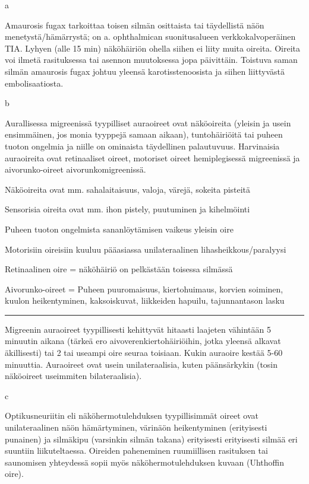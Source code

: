 \documentclass[
]{book}
\begin{document}
a

Amaurosis fugax tarkoittaa toisen silmän osittaista tai täydellistä näön menetystä/hämärrystä; on a. ophthalmican suonitusalueen verkkokalvoperäinen TIA. Lyhyen (alle 15 min) näköhäiriön ohella siihen ei liity muita oireita. Oireita voi ilmetä rasituksessa tai asennon muutoksessa jopa päivittäin. Toistuva saman silmän amaurosis fugax johtuu yleensä karotisstenoosista ja siihen liittyvästä embolisaatiosta.

b

Aurallisessa migreenissä tyypilliset auraoireet ovat näköoireita (yleisin ja usein ensimmäinen, jos monia tyyppejä samaan aikaan), tuntohäiriöitä tai puheen tuoton ongelmia ja niille on ominaista täydellinen palautuvuus. Harvinaisia auraoireita ovat retinaaliset oireet, motoriset oireet hemiplegisessä migreenissä ja aivorunko-oireet aivorunkomigreenissä.

Näköoireita ovat mm. sahalaitaisuus, valoja, värejä, sokeita pisteitä

Sensorisia oireita ovat mm. ihon pistely, puutuminen ja kihelmöinti

Puheen tuoton ongelmista sananlöytämisen vaikeus yleisin oire

Motorisiin oireisiin kuuluu pääasiassa unilateraalinen lihasheikkous/paralyysi

Retinaalinen oire = näköhäiriö on pelkästään toisessa silmässä

Aivorunko-oireet = Puheen puuromaisuus, kiertohuimaus, korvien soiminen, kuulon heikentyminen, kaksoiskuvat, liikkeiden hapuilu, tajunnantason lasku

\begin{center}\rule{0.5\linewidth}{0.5pt}\end{center}

Migreenin auraoireet tyypillisesti kehittyvät hitaasti laajeten vähintään 5 minuutin aikana (tärkeä ero aivoverenkiertohäiriöihin, jotka yleensä alkavat äkillisesti) tai 2 tai useampi oire seuraa toisiaan. Kukin auraoire kestää 5-60 minuuttia. Auraoireet ovat usein unilateraalisia, kuten päänsärkykin (tosin näköoireet useimmiten bilateraalisia).

c

Optikusneuriitin eli näköhermotulehduksen tyypillisimmät oireet ovat unilateraalinen näön hämärtyminen, värinäön heikentyminen (erityisesti punainen) ja silmäkipu (varsinkin silmän takana) erityisesti erityisesti silmää eri suuntiin liikuteltaessa. Oireiden paheneminen ruumiillisen rasituksen tai saunomisen yhteydessä sopii myös näköhermotulehduksen kuvaan (Uhthoffin oire).
\end{document}
